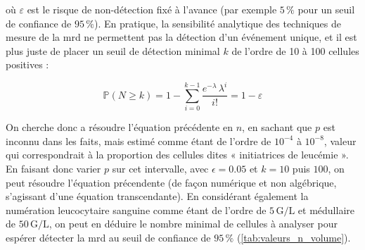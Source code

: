 où $\varepsilon$ est le risque de non-détection fixé à l'avance (par exemple $5\,\%$ pour un seuil de confiance de $95\,\%$).
En pratique, la sensibilité analytique des techniques de mesure de la \gls{mrd} ne permettent pas la détection d'un événement unique, et il est plus juste de placer 
un seuil de détection minimal $k$ de l'ordre de 10 à 100 cellules positives : 

\begin{equation}
    \mathbb{P}(N \geq k) = 1 - \sum_{i = 0}^{k-1} \frac{e^{-\lambda} \, \lambda^{i}}{i!} = 1 - \varepsilon
\end{equation}

On cherche donc a résoudre l'équation précédente en $n$, en sachant que $p$ est inconnu dans les faits, mais estimé comme étant de l'ordre de $10^{-4}$ à $10^{-8}$, 
valeur qui correspondrait à la proportion des cellules dites « initiatrices de leucémie ». En faisant donc varier $p$ sur cet intervalle, avec $\epsilon = 0.05$ et 
$k = 10$ puis $100$, on peut résoudre l'équation précendente (de façon numérique et non algébrique, s'agissant d'une équation transcendante). En considérant également 
la numération leucocytaire sanguine comme étant de l'ordre de $5\,\text{G/L}$ et médullaire de $50\,\text{G/L}$, on peut en déduire le nombre minimal de cellules à analyser 
pour espérer détecter la \gls{mrd} au seuil de confiance de $95\,\%$ (\autoref{tab:valeurs_n_volume}).

